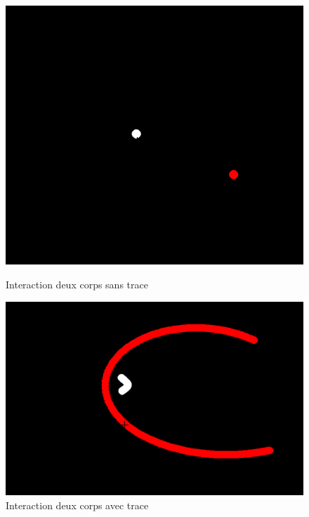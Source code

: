 \documentclass[a4paper, 12pt]{article}
\begin{document}
	\begin{figure}[H]
    	\centering
        \begin{minipage}{0.2\linewidth}
        	\centering
        	\includegraphics[width=\linewidth]{img/couverture.png}
        	\caption{\label{fig:DeuxCorps1} Interaction deux corps sans trace}
    	\end{minipage}
        \hspace{0.05\linewidth}  %
    	\begin{minipage}{0.2\linewidth}
        	\centering
        	\includegraphics[width=\linewidth]{img/interactionDeuxCorps.png}
        	\caption{\label{fig:DeuxCorps2} Interaction deux corps avec trace}

\end{minipage}
\end{figure}
\end{document}
